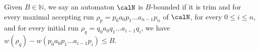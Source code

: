 \documentclass[a4paper]{article}
\begin{document}
%
%
%



Given $B \in \mathbb{N}$, we say an automaton $\calN$ is $B$-bounded if it is
trim and for every maximal accepting run $\rho_p = p_0 a_0 p_1 \dots a_{n-1}
p_n$ of $\calN$,  for every $0 \leq i \leq n$, and for every initial run $\rho_q
= q_0 a_0 q_1 \dots a_{i-1} q_i$, we have $w(\rho_q) - w(p_0 a_0 p_1 \dots
a_{i-1} p_i) \leq B$.
	
\end{document}
